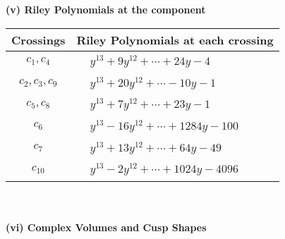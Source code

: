 \documentclass[1p]{elsarticle_modified}
\theoremstyle{definition}
\begin{document}
\newpage\renewcommand{\arraystretch}{1}
\flushleft \textbf{(v) Riley Polynomials at the component}\newline \\
\begin{tabular}{m{50pt}|m{274pt}}
Crossings & \hspace{64pt}Riley Polynomials at each crossing \\
\hline $$\begin{aligned}c_{1},c_{4}\end{aligned}$$&$\begin{aligned}
&y^{13}+9 y^{12}+\cdots+24 y-4
\end{aligned}$\\
\hline $$\begin{aligned}c_{2},c_{3},c_{9}\end{aligned}$$&$\begin{aligned}
&y^{13}+20 y^{12}+\cdots-10 y-1
\end{aligned}$\\
\hline $$\begin{aligned}c_{5},c_{8}\end{aligned}$$&$\begin{aligned}
&y^{13}+7 y^{12}+\cdots+23 y-1
\end{aligned}$\\
\hline $$\begin{aligned}c_{6}\end{aligned}$$&$\begin{aligned}
&y^{13}-16 y^{12}+\cdots+1284 y-100
\end{aligned}$\\
\hline $$\begin{aligned}c_{7}\end{aligned}$$&$\begin{aligned}
&y^{13}+13 y^{12}+\cdots+64 y-49
\end{aligned}$\\
\hline $$\begin{aligned}c_{10}\end{aligned}$$&$\begin{aligned}
&y^{13}-2 y^{12}+\cdots+1024 y-4096
\end{aligned}$\\
\hline
\end{tabular}\\~\\
\newpage\flushleft \textbf{(vi) Complex Volumes and Cusp Shapes}
\end{document}
